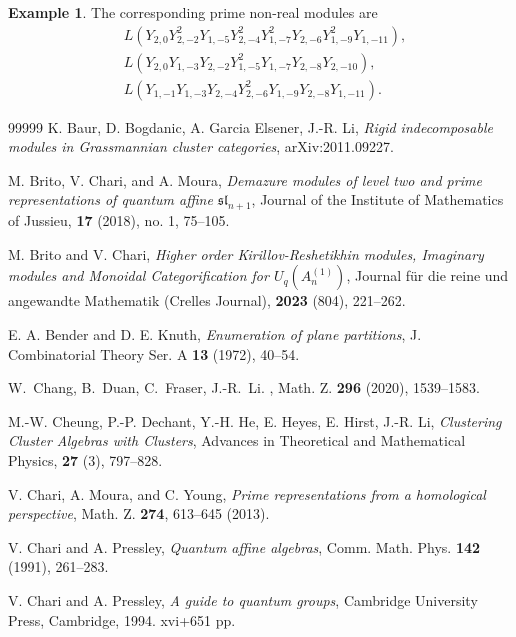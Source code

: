 \documentclass[12pt, reqno]{amsart}
\theoremstyle{plain}
\theoremstyle{definition}
\newtheorem{example}[theorem]{Example}
\numberwithin{equation}{section}
\begin{document}
\begin{example}
The corresponding prime non-real modules are
\begin{align*}
& L(Y_{2, 0}Y_{2, -2}^2 Y_{1, -5}Y_{2, -4}^2 Y_{1, -7}^2 Y_{2, -6}Y_{1, -9}^2 Y_{1, -11}), \\
& L(Y_{2, 0}Y_{1, -3}Y_{2, -2}Y_{1, -5}^2 Y_{1, -7}Y_{2, -8}Y_{2, -10}), \\
& L(Y_{1, -1}Y_{1, -3}Y_{2, -4}Y_{2, -6}^2 Y_{1, -9}Y_{2, -8}Y_{1, -11}).
\end{align*}

\end{example}
 


\begin{thebibliography}{99999}     
 K. Baur, D. Bogdanic, A. Garcia Elsener, J.-R. Li, \textit{Rigid indecomposable modules in Grassmannian cluster categories}, arXiv:2011.09227. 
 
M. Brito, V. Chari, and A. Moura, \textit{Demazure modules of level two and prime representations of quantum affine $\mathfrak{sl}_{n+1}$}, Journal of the Institute of Mathematics of Jussieu, \textbf{17} (2018), no. 1, 75--105. 

 M. Brito and V. Chari, \textit{Higher order Kirillov-Reshetikhin modules, Imaginary modules and Monoidal Categorification for $U_q(A_n^{(1)})$}, Journal f\"{u}r die reine und angewandte Mathematik (Crelles Journal), \textbf{2023} (804), 221--262.

 E. A. Bender and D. E. Knuth, \textit{Enumeration of plane partitions}, J. Combinatorial Theory Ser. A \textbf{13} (1972), 40--54.
  
 W.~Chang, B.~Duan, C.~Fraser, J.-R.~Li. 
, Math. Z. \textbf{296} (2020), 1539--1583.

 M.-W. Cheung, P.-P. Dechant, Y.-H. He, E. Heyes, E. Hirst, J.-R. Li, \textit{Clustering Cluster Algebras with Clusters},
Advances in Theoretical and Mathematical Physics, \textbf{27} (3), 797--828.
 
 V. Chari, A. Moura, and C. Young, \textit{Prime representations from a homological perspective}, Math. Z. \textbf{274}, 613--645 (2013).

 V. Chari and A. Pressley, \textit{Quantum affine algebras}, Comm. Math. Phys. \textbf{142} (1991), 261--283.

 V. Chari and A. Pressley, \textit{A guide to quantum groups}, Cambridge University Press, Cambridge, 1994. xvi+651 pp.


\end{thebibliography}
\end{document}
